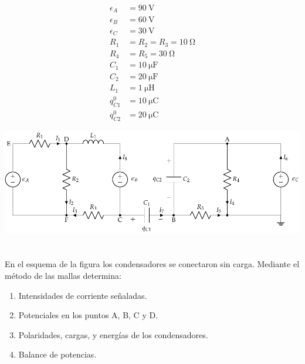 \documentclass[10pt]{article}
\begin{document}
\begin{minipage}[c]{0.2\linewidth}
  \begin{align*}
    \epsilon_{A}&=\SI{90}{\volt}\\
    \epsilon_{B}&=\SI{60}{\volt}\\
    \epsilon_{C}&=\SI{30}{\volt}\\
    R_{1}&= R_2 = R_3 = \SI{10}{\ohm}\\
    R_{4}&= R_5 = \SI{30}{\ohm}\\
    C_{1}&= \SI{10}{\micro\farad}\\
    C_{2}&= \SI{20}{\micro\farad}\\
    L_1 &= \SI{1}{\micro\henry}\\
    q^0_{C1} &= \SI{10}{\micro\coulomb}\\
    q^0_{C2} &= \SI{20}{\micro\coulomb}
  \end{align*}
\end{minipage}
\begin{minipage}[c]{0.8\linewidth}
  \includegraphics[scale = 0.8]{figs/mallas_carga_inicial.pdf}
\end{minipage}

\clearpage

\section{}

En el esquema de la figura los condensadores se conectaron sin
carga. Mediante el método de las mallas determina:
\begin{enumerate}
\item Intensidades de corriente señaladas.
\item Potenciales en los puntos A, B, C y D.
\item Polaridades, cargas, y energías de los condensadores.
\item Balance de potencias.
\end{enumerate}
\end{document}
